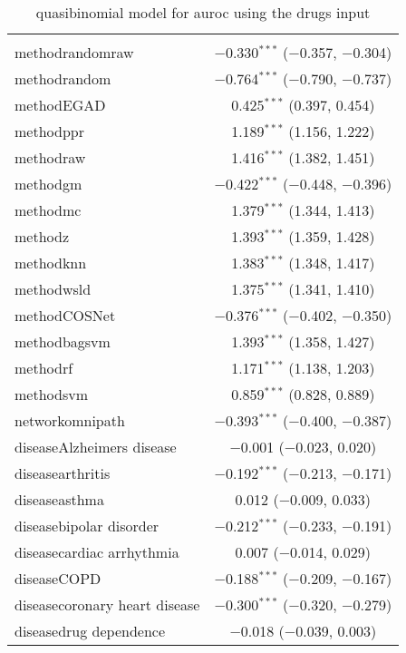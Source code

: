 
\begin{table}[!htbp] \centering 
  \caption{quasibinomial model for auroc using the drugs input} 
  \label{} 
\begin{tabular}{@{\extracolsep{5pt}}lc} 
\\[-1.8ex]\hline 
\hline \\[-1.8ex] 
 methodrandomraw & $-$0.330$^{***}$ ($-$0.357, $-$0.304) \\ 
  methodrandom & $-$0.764$^{***}$ ($-$0.790, $-$0.737) \\ 
  methodEGAD & 0.425$^{***}$ (0.397, 0.454) \\ 
  methodppr & 1.189$^{***}$ (1.156, 1.222) \\ 
  methodraw & 1.416$^{***}$ (1.382, 1.451) \\ 
  methodgm & $-$0.422$^{***}$ ($-$0.448, $-$0.396) \\ 
  methodmc & 1.379$^{***}$ (1.344, 1.413) \\ 
  methodz & 1.393$^{***}$ (1.359, 1.428) \\ 
  methodknn & 1.383$^{***}$ (1.348, 1.417) \\ 
  methodwsld & 1.375$^{***}$ (1.341, 1.410) \\ 
  methodCOSNet & $-$0.376$^{***}$ ($-$0.402, $-$0.350) \\ 
  methodbagsvm & 1.393$^{***}$ (1.358, 1.427) \\ 
  methodrf & 1.171$^{***}$ (1.138, 1.203) \\ 
  methodsvm & 0.859$^{***}$ (0.828, 0.889) \\ 
  networkomnipath & $-$0.393$^{***}$ ($-$0.400, $-$0.387) \\ 
  diseaseAlzheimers disease & $-$0.001 ($-$0.023, 0.020) \\ 
  diseasearthritis & $-$0.192$^{***}$ ($-$0.213, $-$0.171) \\ 
  diseaseasthma & 0.012 ($-$0.009, 0.033) \\ 
  diseasebipolar disorder & $-$0.212$^{***}$ ($-$0.233, $-$0.191) \\ 
  diseasecardiac arrhythmia & 0.007 ($-$0.014, 0.029) \\ 
  diseaseCOPD & $-$0.188$^{***}$ ($-$0.209, $-$0.167) \\ 
  diseasecoronary heart disease & $-$0.300$^{***}$ ($-$0.320, $-$0.279) \\ 
  diseasedrug dependence & $-$0.018 ($-$0.039, 0.003) \\ 

\end{tabular}
\end{table}
